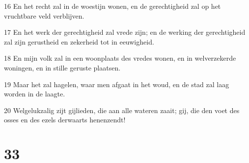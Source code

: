 \par 16 En het recht zal in de woestijn wonen, en de gerechtigheid zal op het vruchtbare veld verblijven.
\par 17 En het werk der gerechtigheid zal vrede zijn; en de werking der gerechtigheid zal zijn gerustheid en zekerheid tot in eeuwigheid.
\par 18 En mijn volk zal in een woonplaats des vredes wonen, en in welverzekerde woningen, en in stille geruste plaatsen.
\par 19 Maar het zal hagelen, waar men afgaat in het woud, en de stad zal laag worden in de laagte.
\par 20 Welgelukzalig zijt gijlieden, die aan alle wateren zaait; gij, die den voet des osses en des ezels derwaarts henenzendt!

\chapter{33}

